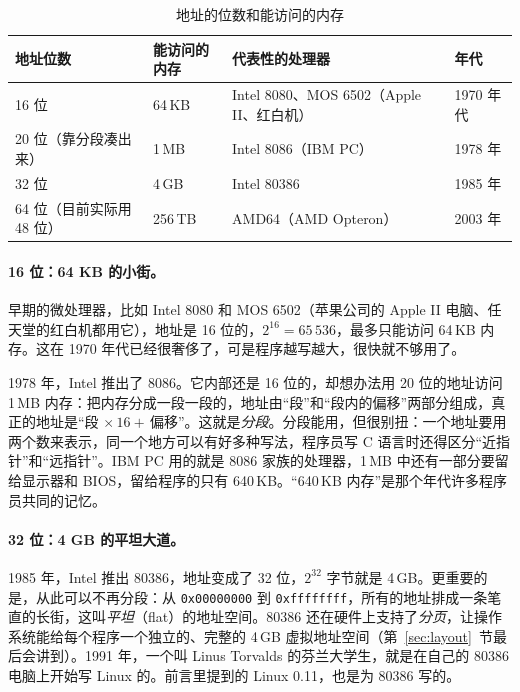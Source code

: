 \begin{table}[htbp]
  \begin{lazywide}
  \small
  \caption{地址的位数和能访问的内存}
  \label{tab:bits}
  \begin{tabular}{L{3.8cm}L{2.4cm}L{5.4cm}L{1.8cm}}
    \toprule
    地址位数 & 能访问的内存 & 代表性的处理器 & 年代 \\
     位 & 64\,KB & Intel 8080、MOS 6502（Apple II、红白机） & 1970 年代 \\
    20 位（靠分段凑出来） & 1\,MB & Intel 8086（IBM PC） & 1978 年 \\
    32 位 & 4\,GB & Intel 80386 & 1985 年 \\
    64 位（目前实际用 48 位） & 256\,TB & AMD64（AMD Opteron） & 2003 年 \\
    \bottomrule
  \end{tabular}
  \end{lazywide}
\end{table}

\paragraph{16 位：64 KB 的小街。}
早期的微处理器，比如 Intel 8080 和 MOS 6502（苹果公司的 Apple II 电脑、任天堂的红白机都用它），地址是 16 位的，$2^{16} = 65\,536$，最多只能访问 64\,KB 内存。这在 1970 年代已经很奢侈了，可是程序越写越大，很快就不够用了。

1978 年，Intel 推出了 8086。它内部还是 16 位的，却想办法用 20 位的地址访问 1\,MB 内存：把内存分成一段一段的，地址由“段”和“段内的偏移”两部分组成，真正的地址是“段\,${}\times 16 +{}$\,偏移”。这就是\emph{分段}。分段能用，但很别扭：一个地址要用两个数来表示，同一个地方可以有好多种写法，程序员写 C 语言时还得区分“近指针”和“远指针”。IBM PC 用的就是 8086 家族的处理器，1\,MB 中还有一部分要留给显示器和 BIOS，留给程序的只有 640\,KB。“640\,KB 内存”是那个年代许多程序员共同的记忆。

\paragraph{32 位：4 GB 的平坦大道。}
1985 年，Intel 推出 80386，地址变成了 32 位，$2^{32}$ 字节就是 4\,GB。更重要的是，从此可以不再分段：从 \texttt{0x00000000} 到 \texttt{0xffffffff}，所有的地址排成一条笔直的长街，这叫\emph{平坦}（flat）的地址空间。80386 还在硬件上支持了\emph{分页}，让操作系统能给每个程序一个独立的、完整的 4\,GB 虚拟地址空间（第~\ref{sec:layout}~节最后会讲到）。1991 年，一个叫 Linus Torvalds 的芬兰大学生，就是在自己的 80386 电脑上开始写 Linux 的。前言里提到的 Linux 0.11，也是为 80386 写的。

